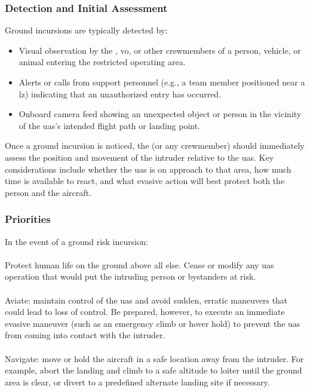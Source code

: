            \subsubsection{Detection and Initial Assessment} Ground incursions are typically detected by:
            \begin{itemize}
                \item Visual observation by the , \ac{vo}, or other crewmembers of a person, vehicle, or animal entering the restricted operating area.
                \item Alerts or calls from support personnel (e.g., a team member positioned near a \ac{lz}) indicating that an unauthorized entry has occurred.
                \item Onboard camera feed showing an unexpected object or person in the vicinity of the \ac{uas}'s intended flight path or landing point.
            \end{itemize}
            Once a ground incursion is noticed, the  (or any crewmember) should immediately assess the position and movement of the intruder relative to the \ac{uas}. Key considerations include whether the \ac{uas} is on approach to that area, how much time is available to react, and what evasive action will best protect both the person and the aircraft.
            
            \subsubsection{Priorities} In the event of a ground risk incursion:
                \paragraph{}Protect human life on the ground above all else. Cease or modify any \ac{uas} operation that would put the intruding person or bystanders at risk.
                \paragraph{}Aviate: maintain control of the \ac{uas} and avoid sudden, erratic maneuvers that could lead to loss of control. Be prepared, however, to execute an immediate evasive maneuver (such as an emergency climb or hover hold) to prevent the \ac{uas} from coming into contact with the intruder.
                \paragraph{}Navigate: move or hold the aircraft in a safe location away from the intruder. For example, abort the landing and climb to a safe altitude to loiter until the ground area is clear, or divert to a predefined alternate landing site if necessary.
